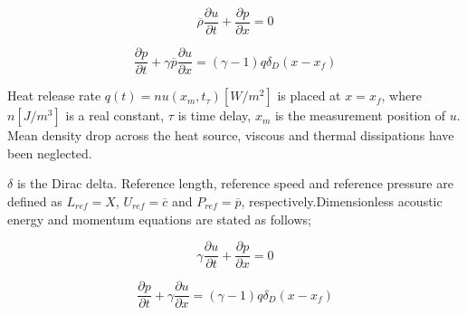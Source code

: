 \begin{equation}
\overline{\rho}\frac{\partial u}{\partial t}+
\frac{\partial p}{\partial x}=0
\end{equation}

\begin{equation}
\frac{\partial p}{\partial t}+
\gamma \overline{p} \frac{\partial u}{\partial x}=(\gamma-1)q\delta_D (x-x_f)
\end{equation}
  
  
  
  Heat release rate $q(t)=nu(x_m,t_\tau) [W/m^2] $ is placed at $x=x_f$, where $n [J/m^3]$ is a real constant, $\tau$ is time delay, $x_m$ is the measurement position of $u$. Mean
  density drop across the heat source, viscous and thermal dissipations have been neglected. 
  
  $\delta$ is the Dirac delta. Reference length, reference speed and reference pressure are defined as $L_{ref}=X$, $U_{ref}=\overline{c}$ and $P_{ref}=\overline{p}$, respectively.Dimensionless acoustic energy and momentum equations are stated as follows;
  
  \begin{equation}
  \gamma \frac{\partial u}{\partial t}+
  \frac{\partial p}{\partial x}=0
  \label{eq:nondim1}
  \end{equation}
  
  \begin{equation}
  \frac{\partial p}{\partial t}+
  \gamma \frac{\partial u}{\partial x}=(\gamma-1)q\delta_D (x-x_f)
  \label{eq:nondim2}
  \end{equation}
  